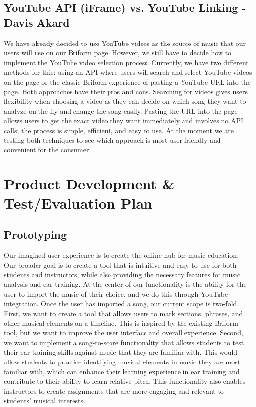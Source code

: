 \documentclass[12pt, letterpaper]{article}
\begin{document}
\subsection*{YouTube API (iFrame) vs. YouTube Linking - Davis Akard}
We have already decided to use YouTube videos as the source of music that our users will use on our Briform page. However, we still have to decide how to implement the YouTube video selection process. Currently, we have two different methods for this: using an API where users will search and select YouTube videos on the page or the classic Briform experience of pasting a YouTube URL into the page. Both approaches have their pros and cons. Searching for videos gives users flexibility when choosing a video as they can decide on which song they want to analyze on the fly and change the song easily. Pasting the URL into the page allows users to get the exact video they want immediately and involves no API calls; the process is simple, efficient, and easy to use. At the moment we are testing both techniques to see which approach is most user-friendly and convenient for the consumer.

\section*{Product Development \& Test/Evaluation Plan}

\subsection*{Prototyping}

Our imagined user experience is to create the online hub for music education.  Our broader goal is to create a tool that is intuitive and easy to use for both students and instructors, while also providing the necessary features for music analysis and ear training.  At the center of our functionality is the ability for the user to import the music of their choice, and we do this through YouTube integration.  Once the user has imported a song, our current scope is two-fold.  First, we want to create a tool that allows users to mark sections, phrases, and other musical elements on a timeline.  This is inspired by the existing Briform tool, but we want to improve the user interface and overall experience.  Second, we want to implement a song-to-score functionality that allows students to test their ear training skills against music that they are familiar with.  This would allow students to practice identifying musical elements in music they are most familiar with, which can enhance their learning experience in ear training and contribute to their ability to learn relative pitch.  This functionality also enables instructors to create assignments that are more engaging and relevant to students' musical interests.
\end{document}
